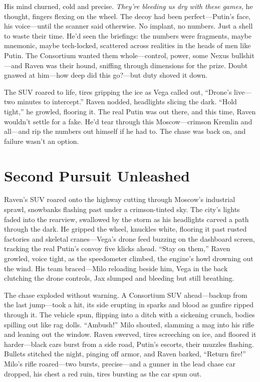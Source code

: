 \documentclass[12pt]{book}
\begin{document}
His mind churned, cold and precise. \textit{They’re bleeding us dry with these games,} he thought, fingers flexing on the wheel. The decoy had been perfect—Putin’s face, his voice—until the scanner said otherwise. No implant, no numbers. Just a shell to waste their time. He’d seen the briefings: the numbers were fragments, maybe mnemonic, maybe tech-locked, scattered across realities in the heads of men like Putin. The Consortium wanted them whole—control, power, some Nexus bullshit—and Raven was their hound, sniffing through dimensions for the prize. Doubt gnawed at him—how deep did this go?—but duty shoved it down.

The SUV roared to life, tires gripping the ice as Vega called out, “Drone’s live—two minutes to intercept.” Raven nodded, headlights slicing the dark. “Hold tight,” he growled, flooring it. The real Putin was out there, and this time, Raven wouldn’t settle for a fake. He’d tear through this Moscow—crimson Kremlin and all—and rip the numbers out himself if he had to. The chase was back on, and failure wasn’t an option.


\section{Second Pursuit Unleashed}

Raven’s SUV roared onto the highway cutting through Moscow’s industrial sprawl, snowbanks flashing past under a crimson-tinted sky. The city’s lights faded into the rearview, swallowed by the storm as his headlights carved a path through the dark. He gripped the wheel, knuckles white, flooring it past rusted factories and skeletal cranes—Vega’s drone feed buzzing on the dashboard screen, tracking the real Putin’s convoy five klicks ahead. “Stay on them,” Raven growled, voice tight, as the speedometer climbed, the engine’s howl drowning out the wind. His team braced—Milo reloading beside him, Vega in the back clutching the drone controls, Jax slumped and bleeding but still breathing.

The chase exploded without warning. A Consortium SUV ahead—backup from the last jump—took a hit, its side erupting in sparks and blood as gunfire ripped through it. The vehicle spun, flipping into a ditch with a sickening crunch, bodies spilling out like rag dolls. “Ambush!” Milo shouted, slamming a mag into his rifle and leaning out the window. Raven swerved, tires screeching on ice, and floored it harder—black cars burst from a side road, Putin’s escorts, their muzzles flashing. Bullets stitched the night, pinging off armor, and Raven barked, “Return fire!” Milo’s rifle roared—two bursts, precise—and a gunner in the lead chase car dropped, his chest a red ruin, tires bursting as the car spun out.
\end{document}
